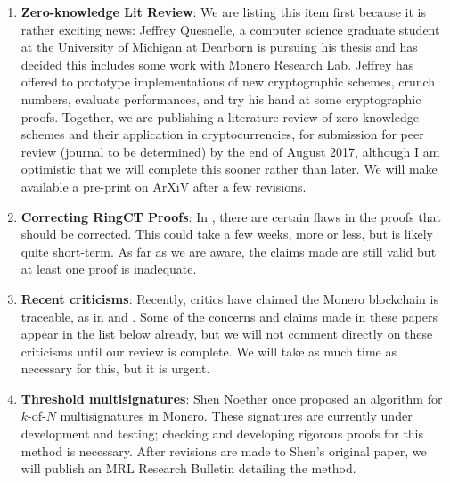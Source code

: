 \documentclass[12pt,english]{mrl}
\theoremstyle{definition}
\numberwithin{equation}{section}
\numberwithin{figure}{section}
\numberwithin{equation}{section}
\numberwithin{equation}{section}
\numberwithin{figure}{section}
\begin{document}
\begin{enumerate}[1.]

    \item \textbf{Zero-knowledge Lit Review}: We are listing this item first because it is rather exciting news: Jeffrey Quesnelle, a computer science graduate student at the University of Michigan at Dearborn is pursuing his thesis and has decided this includes some work with Monero Research Lab. Jeffrey has offered to prototype implementations of new cryptographic schemes, crunch numbers, evaluate performances, and try his hand at some cryptographic proofs. Together, we are publishing a literature review of zero knowledge schemes and their application in cryptocurrencies, for submission for peer review (journal to be determined) by the end of August 2017, although I am optimistic that we will complete this sooner rather than later. We will make available a pre-print on ArXiV after a few revisions.
    
    
    \item \textbf{Correcting RingCT Proofs}: In \cite{noether2016ring}, there are certain flaws in the proofs that should be corrected. This could take a few weeks, more or less, but is likely quite short-term. As far as we are aware, the claims made are still valid but at least one proof is inadequate.
    
    \item \textbf{Recent criticisms}: Recently, critics have claimed the Monero blockchain is traceable, as in \cite{miller2017empirical} and \cite{kumar2017traceability}. Some of the concerns and claims made in these papers appear in the list below already, but we will not comment directly on these criticisms until our review is complete. We will take as much time as necessary for this, but it is urgent.
    
    \item \textbf{Threshold multisignatures}: Shen Noether once proposed an algorithm for  $k$-of-$N$ multisignatures in Monero.  These signatures are currently under development and testing; checking and developing rigorous proofs for this method is necessary. After revisions are made to Shen's original paper, we will publish an MRL Research Bulletin detailing the method.
    
    
    
    
    

\end{enumerate}
\end{document}
